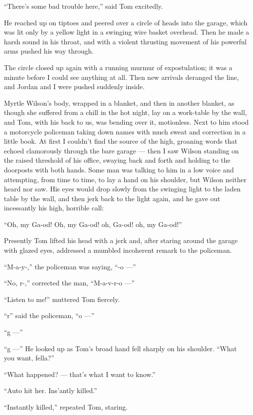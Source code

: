 \documentclass{znotebook}
\begin{document}
``There's some bad trouble here,'' said Tom excitedly.

He reached up on tiptoes and peered over a circle of heads into the garage, which was lit only by a yellow light in a swinging wire basket overhead. Then he made a harsh sound in his throat, and with a violent thrusting movement of his powerful arms pushed his way through.

The circle closed up again with a running murmur of expostulation; it was a minute before I could see anything at all. Then new arrivals deranged the line, and Jordan and I were pushed suddenly inside.

Myrtle Wilson's body, wrapped in a blanket, and then in another blanket, as though she suffered from a chill in the hot night, lay on a work-table by the wall, and Tom, with his back to us, was bending over it, motionless. Next to him stood a motorcycle policeman taking down names with much sweat and correction in a little book. At first I couldn't find the source of the high, groaning words that echoed clamorously through the bare garage ---{} then I saw Wilson standing on the raised threshold of his office, swaying back and forth and holding to the doorposts with both hands. Some man was talking to him in a low voice and attempting, from time to time, to lay a hand on his shoulder, but Wilson neither heard nor saw. His eyes would drop slowly from the swinging light to the laden table by the wall, and then jerk back to the light again, and he gave out incessantly his high, horrible call:

``Oh, my Ga-od! Oh, my Ga-od! oh, Ga-od! oh, my Ga-od!''

Presently Tom lifted his head with a jerk and, after staring around the garage with glazed eyes, addressed a mumbled incoherent remark to the policeman.

``M-a-y-,'' the policeman was saying, ``-o ---''

``No, r-,'' corrected the man, ``M-a-v-r-o ---''

``Listen to me!'' muttered Tom fiercely.

``r'' said the policeman, ``o ---''

``g ---''

``g ---'' He looked up as Tom's broad hand fell sharply on his shoulder. ``What you want, fella?''

``What happened? ---{} that's what I want to know.''

``Auto hit her. Ins'antly killed.''

``Instantly killed,'' repeated Tom, staring.
\end{document}
